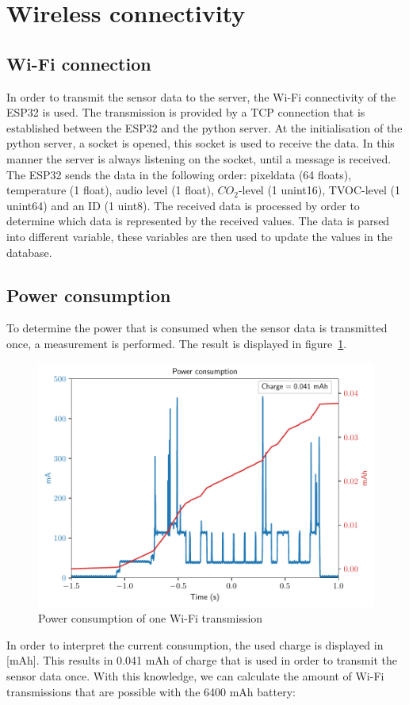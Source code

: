 \documentclass[11pt,a4paper]{article}
\begin{document}
\section{Wireless connectivity}
\subsection{Wi-Fi connection}
In order to transmit the sensor data to the server, the Wi-Fi connectivity of the ESP32 is used. The transmission is provided by a TCP connection that is established between the ESP32 and the python server. At the initialisation of the python server, a socket is opened, this socket is used to receive the data. In this manner the server is always listening on the socket, until a message is received. The ESP32 sends the data in the following order: pixeldata (64 floats), temperature (1 float), audio level (1 float), $CO_2$-level (1 unint16), TVOC-level (1 unint64) and an ID (1 uint8). The received data is processed by order to determine which data is represented by the received values. The data is parsed into different variable, these variables are then used to update the values in the database. 

\subsection{Power consumption}
To determine the power that is consumed when the sensor data is transmitted once, a measurement is performed. The result is displayed in figure~\ref{fig:wifi_pwr}.
\begin{figure}[H]
	\centering
	\includegraphics[width=1.0\linewidth]{wifi_pwr.pdf}
	\caption{Power consumption of one Wi-Fi transmission}
	\label{fig:wifi_pwr}
\end{figure}
In order to interpret the current consumption, the used charge is displayed in [mAh]. This results in 0.041 mAh of charge that is used in order to transmit the sensor data once. With this knowledge, we can calculate the amount of Wi-Fi transmissions that are possible with the 6400 mAh battery:
\end{document}
